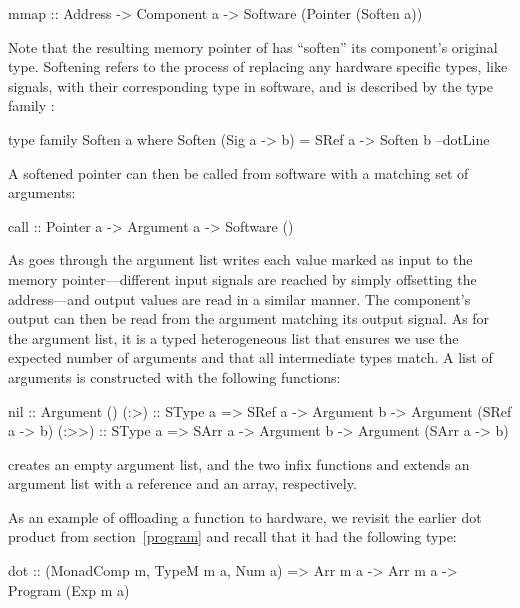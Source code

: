 \documentclass[../paper.tex]{subfiles}
\begin{document}
\begin{code}
mmap :: Address -> Component a -> Software (Pointer (Soften a))
\end{code}

\noindent Note that the resulting memory pointer of  has ``soften'' its component's original type. Softening refers to the process of replacing any hardware specific types, like signals, with their corresponding type in software, and is described by the type family :

\begin{code}
type family Soften a where
  Soften (Sig a -> b) = SRef a -> Soften b
  --dotLine
\end{code}

A softened pointer can then be called from software with a matching set of arguments:

\begin{code}
call :: Pointer a -> Argument a -> Software ()
\end{code}

\noindent As  goes through the argument list writes each value marked as input to the memory pointer---different input signals are reached by simply offsetting the address---and output values are read in a similar manner. The component's output can then be read from the argument matching its output signal. As for the argument list, it is a typed heterogeneous list that ensures we use the expected number of arguments and that all intermediate types match. A list of arguments is constructed with the following functions:


\begin{code}
nil   :: Argument ()
(:>)  :: SType a => SRef a -> Argument b -> Argument (SRef a -> b)
(:>>) :: SType a => SArr a -> Argument b -> Argument (SArr a -> b)
\end{code}

\noindent {} creates an empty argument list, and the two infix functions \codei{(:>)} and \codei{(:>>)} extends an argument list with a reference and an array, respectively.

As an example of offloading a function to hardware, we revisit the earlier dot product from section~\ref{program} and recall that it had the following type:

\begin{code}
dot :: (MonadComp m, TypeM m a, Num a) => Arr m a -> Arr m a
  -> Program (Exp m a)
\end{code}
\end{document}

